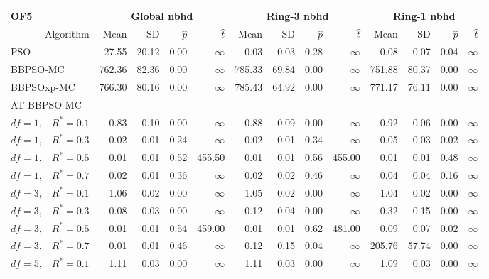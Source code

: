 \documentclass[cmbright]{staauth}
\begin{document}
\begin{table}[ht]
\centering
\tiny{
\begin{tabular}{r|rrrr|rrrr|rrrr}
\multicolumn{1}{l}{OF5} & \multicolumn{4}{c}{Global nbhd} & \multicolumn{4}{c}{Ring-3 nbhd} & \multicolumn{4}{c}{Ring-1 nbhd}\\
  \hline
Algorithm & Mean & SD & $\widehat{p}$ & $\widehat{t}$ & Mean & SD & $\widehat{p}$ & $\widehat{t}$ & Mean & SD & $\widehat{p}$ & $\widehat{t}$ \\
  \hline
\multicolumn{1}{l|}{PSO} & 27.55 & 20.12 & 0.00 & $\infty$ & 0.03 & 0.03 & 0.28 & $\infty$ & 0.08 & 0.07 & 0.04 & $\infty$ \\
  \multicolumn{1}{l|}{BBPSO-MC} & 762.36 & 82.36 & 0.00 & $\infty$ & 785.33 & 69.84 & 0.00 & $\infty$ & 751.88 & 80.37 & 0.00 & $\infty$ \\
  \multicolumn{1}{l|}{BBPSOxp-MC} & 766.30 & 80.16 & 0.00 & $\infty$ & 785.43 & 64.92 & 0.00 & $\infty$ & 771.17 & 76.11 & 0.00 & $\infty$ \\
\hline
\multicolumn{1}{l|}{AT-BBPSO-MC} &&&&&&&&&&&&\\
  $df = 1,\enspace$ $R^* =0.1$ & 0.83 & 0.10 & 0.00 & $\infty$ & 0.88 & 0.09 & 0.00 & $\infty$ & 0.92 & 0.06 & 0.00 & $\infty$ \\
  $df = 1,\enspace$ $R^* =0.3$ & 0.02 & 0.01 & 0.24 & $\infty$ & 0.02 & 0.01 & 0.34 & $\infty$ & 0.05 & 0.03 & 0.02 & $\infty$ \\
  $df = 1,\enspace$ $R^* =0.5$ & 0.01 & 0.01 & 0.52 & 455.50 & 0.01 & 0.01 & 0.56 & 455.00 & 0.01 & 0.01 & 0.48 & $\infty$ \\
  $df = 1,\enspace$ $R^* =0.7$ & 0.02 & 0.01 & 0.36 & $\infty$ & 0.02 & 0.02 & 0.46 & $\infty$ & 0.04 & 0.04 & 0.16 & $\infty$ \\
  $df = 3,\enspace$ $R^* =0.1$ & 1.06 & 0.02 & 0.00 & $\infty$ & 1.05 & 0.02 & 0.00 & $\infty$ & 1.04 & 0.02 & 0.00 & $\infty$ \\
  $df = 3,\enspace$ $R^* =0.3$ & 0.08 & 0.03 & 0.00 & $\infty$ & 0.12 & 0.04 & 0.00 & $\infty$ & 0.32 & 0.15 & 0.00 & $\infty$ \\
  $df = 3,\enspace$ $R^* =0.5$ & 0.01 & 0.01 & 0.54 & 459.00 & 0.01 & 0.01 & 0.62 & 481.00 & 0.09 & 0.07 & 0.02 & $\infty$ \\
  $df = 3,\enspace$ $R^* =0.7$ & 0.01 & 0.01 & 0.46 & $\infty$ & 0.12 & 0.15 & 0.04 & $\infty$ & 205.76 & 57.74 & 0.00 & $\infty$ \\
  $df = 5,\enspace$ $R^* =0.1$ & 1.11 & 0.03 & 0.00 & $\infty$ & 1.11 & 0.03 & 0.00 & $\infty$ & 1.09 & 0.03 & 0.00 & $\infty$ \\

\end{tabular}}
\end{table}
\end{document}
